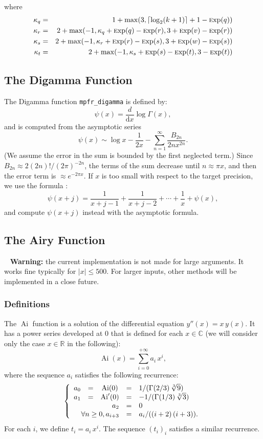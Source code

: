 \documentclass[12pt]{amsart}
\DeclareMathOperator{\Ai}{Ai}
\def\Exp{{\rm \textsc exp}}
\def\R{{\mathbb R}}
\def\C{{\mathbb C}}
\begin{document}
where 
\begin{eqnarray*}
\kappa_q & = & 1 + {\rm max}(3, \lceil\log_2(k+1)\rceil + 1 - \Exp(q))\\
\kappa_r & = & 2 + {\rm max}(-1, \kappa_q + \Exp(q) - \Exp(r),
3 + \Exp(v) - \Exp(r))\\
\kappa_s & = & 2 + {\rm max}(-1, \kappa_r + \Exp(r) - \Exp(s),
3 + \Exp(w) - \Exp(s))\\
\kappa_t & = & 2 + {\rm max}(-1, \kappa_s + \Exp(s) - \Exp(t),
3 - \Exp(t))
\end{eqnarray*}

\subsection{The Digamma Function}

The Digamma function \texttt{mpfr\_digamma} is defined by:
\[ \psi(x) = \frac{d}{{\mathrm d}x} \log\Gamma(x), \]
and is computed from the asymptotic series \cite{Smith01}
\[ \psi(x) \sim \log x - \frac{1}{2x} - \sum_{n=1}^{\infty}
   \frac{B_{2n}}{2n x^{2n}}. \]
(We assume the error in the sum is bounded by the first neglected term.)
Since $B_{2n} \approx 2 (2n)!/(2\pi)^{-2n}$, the terms of the sum decrease
until $n \approx \pi x$, and then the error term is $\approx e^{-2\pi x}$.
If $x$ is too small with respect to the target precision, we use the formula
\cite{Smith01}:
\[ \psi(x+j) = \frac{1}{x+j-1} + \frac{1}{x+j-2} + \cdots + \frac{1}{x} +
\psi(x), \]
and compute $\psi(x+j)$ instead with the asymptotic formula.

\subsection{The Airy Function}
~\newline
\textbf{Warning:} the current implementation is not made for large arguments. It works fine typically for $|x| \le 500$. For larger inputs, other methods will be implemented in a close future.

\subsubsection{Definitions}
The $\Ai$ function is a solution of the differential equation $y''(x) = x\,y(x)$. It has a power series developed at $0$ that is defined for each $x \in \C$ (we will consider only the case $x \in \R$ in the following):
\begin{equation}
  \label{defAi}
  \Ai(x) = \sum_{i=0}^{+\infty} a_i\,x^i,
\end{equation}
where the sequence $a_i$ satisfies the following recurrence:
     $$\left\{ \begin{array}{ccccl}
         a_0 & = & \Ai(0) & = & 1/ ( \Gamma(2/3)\,\sqrt[3]{9} )\\
         a_1 & = & \Ai'(0)& = &-1/ (\Gamma(1/3)\,\sqrt[3]{3})\\
         \multicolumn{3}{r}{a_2} & = & 0\\
         \multicolumn{3}{r}{\forall n\ge0, a_{i+3}}& = & a_i / ((i+2)\,(i+3)).
       \end{array}
       \right.
       $$
For each $i$, we define $t_i = a_i\,x^i$. The sequence $(t_i)_i$ satisfies a similar recurrence.
\end{document}
